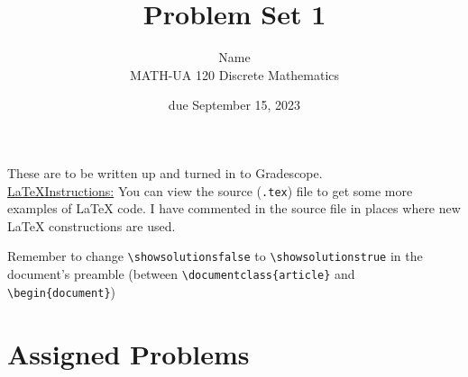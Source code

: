 \documentclass{article}
\title{Problem Set 1}
\author{%
    Name
\\  MATH-UA 120 Discrete Mathematics
}
\date{due September 15, 2023}
\newif\ifshowsolutions
\newcommand{\danger}{\marginpar[\hfill\dbend]{\dbend\hfill}}
\theoremstyle{definition}
\begin{document}
\maketitle



These are to be written up and turned in to Gradescope.\\



\ifshowsolutions
    \SetupExSheets{solution/print=true}
\else
    \danger
 \underline{ \LaTeX  Instructions:}  You can view the source (\texttt{.tex}) file to get some more examples of \LaTeX{} code.  I have commented in the source file in places where new \LaTeX{} constructions are used.
  
  Remember to change \verb|\showsolutionsfalse| to \verb|\showsolutionstrue|
    in the document's preamble 
    (between \verb|\documentclass{article}| and \verb|\begin{document}|)
\fi

\section*{Assigned Problems}
\end{document}
